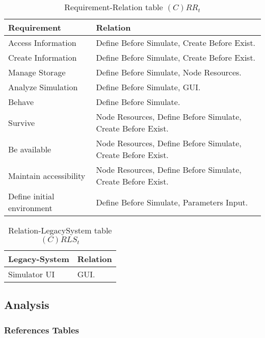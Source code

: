 \begin{table}[H]
	\centering
	\begin{tabular}{|p{4cm}|p{8cm}|}
			\hline
			\textbf{Requirement} & \textbf{Relation} \\
			\hline
			Access Information & Define Before Simulate, Create
			Before Exist. \\
			\hline
			Create Information & Define Before Simulate, Create
			Before Exist. \\
			\hline
			Manage Storage & Define Before Simulate, Node Resources.  \\
			\hline
			Analyze Simulation & Define Before Simulate, GUI. \\
			\hline
			Behave & Define Before Simulate. \\
			\hline
			Survive & Node Resources, Define Before Simulate, Create Before Exist. \\
			\hline
			Be available & Node Resources, Define Before Simulate, Create Before Exist. \\
			\hline
			Maintain accessibility & Node Resources, Define Before Simulate, Create Before Exist. \\
			\hline
			Define initial environment & Define Before Simulate, Parameters Input. \\
			\hline
		\end{tabular}
	\caption{Requirement-Relation table $(C)RR_t$}
	\label{tab:crrt}
\end{table}

\begin{table}[H]
	\centering
	\begin{tabular}{|p{4cm}|p{8cm}|}
			\hline
			\textbf{Legacy-System} & \textbf{Relation} \\
			\hline
			Simulator UI & GUI. \\
			\hline
		\end{tabular}
	\caption{Relation-LegacySystem table $(C)RLS_t$}
	\label{tab:crlst}
\end{table}

\subsection{Analysis}

\subsubsection{References Tables}

